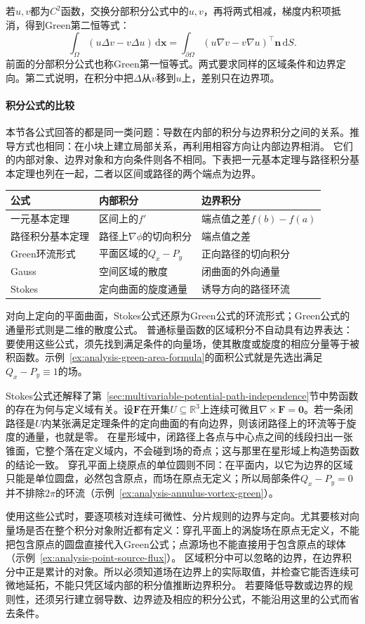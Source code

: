 若$u,v$都为$C^2$函数，交换分部积分公式中的$u,v$，再将两式相减，梯度内积项抵消，得到Green第二恒等式：
\[
 \int_\Omega (u\Delta v-v\Delta u)\,\mathrm d\bm x
 =\int_{\partial\Omega}(u\nabla v-v\nabla u)^\top\bm n\,\mathrm dS.
\]
前面的分部积分公式也称Green第一恒等式。两式要求同样的区域条件和边界定向。第二式说明，在积分中把$\Delta$从$v$移到$u$上，差别只在边界项。

\paragraph{积分公式的比较}

本节各公式回答的都是同一类问题：导数在内部的积分与边界积分之间的关系。推导方式也相同：在小块上建立局部关系，再利用相容方向让内部边界相消。
它们的内部对象、边界对象和方向条件则各不相同。下表把一元基本定理与路径积分基本定理也列在一起，二者以区间或路径的两个端点为边界。
\begin{center}
\begin{tabular}{lll}
\toprule
公式 & 内部积分 & 边界积分\\
\midrule
一元基本定理 & 区间上的$f'$ & 端点值之差$f(b)-f(a)$\\
路径积分基本定理 & 路径上$\nabla\phi$的切向积分 & 端点值之差\\
Green环流形式 & 平面区域的$Q_x-P_y$ & 正向路径的切向积分\\
Gauss & 空间区域的散度 & 闭曲面的外向通量\\
Stokes & 定向曲面的旋度通量 & 诱导方向的路径环流\\
\bottomrule
\end{tabular}
\end{center}
对向上定向的平面曲面，Stokes公式还原为Green公式的环流形式；Green公式的通量形式则是二维的散度公式。
普通标量函数的区域积分不自动具有边界表达：要使用这些公式，须先找到满足条件的向量场，使其散度或旋度的相应分量等于被积函数。示例~\ref{ex:analysis-green-area-formula}的面积公式就是先选出满足$Q_x-P_y\equiv1$的场。

Stokes公式还解释了第~\ref{sec:multivariable-potential-path-independence}节中势函数的存在为何与定义域有关。设$\bm F$在开集$U\subseteq\mathbb R^3$上连续可微且$\nabla\times\bm F=\bm0$。若一条闭路径是$U$内某张满足定理条件的定向曲面的有向边界，则该闭路径上的环流等于旋度的通量，也就是零。
在星形域中，闭路径上各点与中心点之间的线段扫出一张锥面，它整个落在定义域内，不会碰到场的奇点；这与那里在星形域上构造势函数的结论一致。
穿孔平面上绕原点的单位圆则不同：在平面内，以它为边界的区域只能是单位圆盘，必然包含原点，而场在原点无定义；所以局部条件$Q_x-P_y=0$并不排除$2\pi$的环流（示例~\ref{ex:analysis-annulus-vortex-green}）。

使用这些公式时，要逐项核对连续可微性、分片规则的边界与定向。尤其要核对向量场是否在整个积分对象附近都有定义：穿孔平面上的涡旋场在原点无定义，不能把包含原点的圆盘直接代入Green公式；点源场也不能直接用于包含原点的球体（示例~\ref{ex:analysis-point-source-flux}）。
区域积分中可以忽略的边界，在边界积分中正是累计的对象。所以必须知道场在边界上的实际取值，并检查它能否连续可微地延拓，不能只凭区域内部的积分值推断边界积分。
若要降低导数或边界的规则性，还须另行建立弱导数、边界迹及相应的积分公式，不能沿用这里的公式而省去条件。

\FloatBarrier
